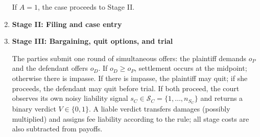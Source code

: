 \documentclass{article}
\begin{document}
\begin{enumerate}
If $A=1$, the case proceeds to Stage II.




  \item \textbf{Stage II: Filing and case entry}

  \item \textbf{Stage III: Bargaining, quit options, and trial}

  The parties submit one round of simultaneous offers: the plaintiff demands $o_P$ and the defendant offers $o_D$. If $o_D \ge o_P$, settlement occurs at the midpoint; otherwise there is impasse. If there is impasse, the plaintiff may quit; if she proceeds, the defendant may quit before trial. If both proceed, the court observes its own noisy liability signal $s_C \in \mathcal{S}_C = \{1,\dots,n_{S_C}\}$ and returns a binary verdict $V \in \{0,1\}$. A liable verdict transfers damages (possibly multiplied) and assigns fee liability according to the rule; all stage costs are also subtracted from payoffs.


\end{enumerate}

\printbibliography
\end{document}
